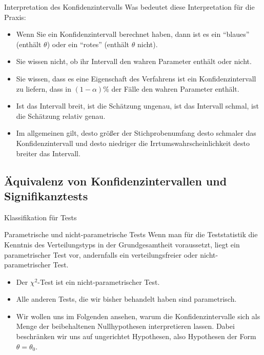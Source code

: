 \documentclass[usenames,dvipsnames,handout]{beamer}
\begin{document}
\begin{frame}{Interpretation des Konfidenzintervalls}
Was bedeutet diese Interpretation für die Praxis:
\begin{itemize}
\item{Wenn Sie ein Konfidenzintervall berechnet haben, dann ist es ein ``blaues'' (enthält $\theta$)
oder ein ``rotes'' (enthält $\theta$ nicht).}\pause
\item{Sie wissen nicht, ob ihr Intervall den wahren Parameter enthält oder nicht.}\pause
\item{Sie wissen, dass es eine Eigenschaft des Verfahrens ist ein Konfidenzintervall zu liefern,
dass in $(1-\alpha)\%$ der Fälle den wahren Parameter enthält.}\pause
\item{Ist das Intervall breit, ist die Schätzung ungenau, ist das Intervall schmal, ist die Schätzung
relativ genau.}\pause
\item{Im allgemeinen gilt, desto größer der Stichprobenumfang desto schmaler das Konfidenzintervall und
desto niedriger die Irrtumswahrscheinlichkeit desto breiter das Intervall.}
\end{itemize}
\end{frame}
\subsection{Äquivalenz von Konfidenzintervallen und Signifikanztests}
%
\begin{frame}{Klassifikation für Tests}
\begin{block}{Parametrische und nicht-parametrische Tests}
Wenn man für die Teststatistik die Kenntnis des Verteilungstyps in der Grundgesamtheit
 voraussetzt, liegt ein parametrischer Test vor, andernfalls ein verteilungsfreier
oder nicht-parametrischer Test.
\end{block}\pause
\begin{itemize}
\item{Der $\chi^{2}$-Test ist ein nicht-parametrischer Test.}
\item{ Alle anderen Tests, die wir bisher behandelt
haben sind parametrisch.}
\item{Wir wollen uns im Folgenden ansehen, warum die Konfidenzintervalle sich als Menge
der beibehaltenen Nullhypothesen interpretieren lassen. Dabei beschränken wir uns
auf ungerichtet Hypothesen, also Hypothesen der Form $\theta=\theta_{0}.$}
\end{itemize}

\end{frame}
\end{document}
